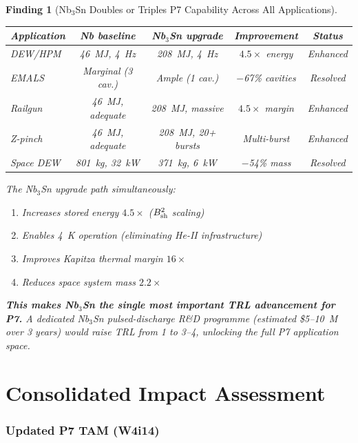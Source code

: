 \documentclass[11pt]{article}
\newtheorem{finding}{Finding}
\begin{document}
\begin{finding}[Nb$_3$Sn Doubles or Triples P7 Capability Across All Applications]
\label{find:Nb3Sn-envelope}
\begin{center}
\begin{tabular}{lcccc}
\toprule
Application & Nb baseline & Nb$_3$Sn upgrade & Improvement & Status \\
\midrule
DEW/HPM & 46~MJ, 4~Hz & 208~MJ, 4~Hz & $4.5\times$ energy & Enhanced \\
EMALS & Marginal (3 cav.) & Ample (1 cav.) & $-$67\% cavities & Resolved \\
Railgun & 46~MJ, adequate & 208~MJ, massive & $4.5\times$ margin & Enhanced \\
Z-pinch & 46~MJ, adequate & 208~MJ, 20+ bursts & Multi-burst & Enhanced \\
Space DEW & 801~kg, 32~kW & 371~kg, 6~kW & $-$54\% mass & Resolved \\
\bottomrule
\end{tabular}
\end{center}

The Nb$_3$Sn upgrade path simultaneously:
\begin{enumerate}[nosep]
  \item Increases stored energy $4.5\times$ ($B_{\rm sh}^2$ scaling)
  \item Enables 4~K operation (eliminating He-II infrastructure)
  \item Improves Kapitza thermal margin $16\times$
  \item Reduces space system mass $2.2\times$
\end{enumerate}

\textbf{This makes Nb$_3$Sn the single most important TRL advancement
for P7.} A dedicated Nb$_3$Sn pulsed-discharge R\&D programme
(estimated \$5--10~M over 3 years) would raise TRL from 1 to 3--4,
unlocking the full P7 application space.
\end{finding}

\part{Consolidated Impact Assessment}
\label{part:impact}

\section{Updated P7 TAM (W4i14)}
\end{document}
